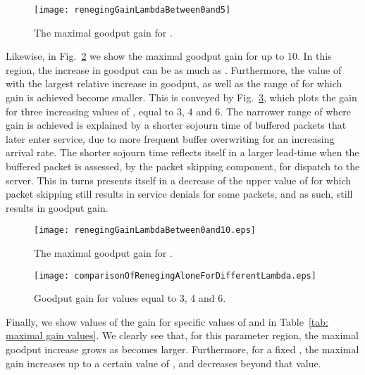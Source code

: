 \documentclass[preprint,12pt]{elsarticle}
\theoremstyle{definition}
\theoremstyle{plain}
\theoremstyle{remark}
\begin{document}
\begin{figure}[t]
\begin{center}
\texttt{[image: renegingGainLambdaBetween0and5]}
\caption{The maximal goodput gain for .}
\label{fig: maximal gain up to 5}
\end{center}
\end{figure}



Likewise, in Fig.~\ref{fig: maximal gain up to 10} we show the maximal goodput gain for  up to 10. In this region, the increase in goodput can be as much as . Furthermore, the value of  with the largest relative increase in goodput, as well as the range of  for which gain is achieved become smaller. This is conveyed by Fig.~\ref{fig: Goodput different rates}, which plots the gain for three increasing values of , equal to 3, 4 and 6.
The narrower range of  where gain is achieved is explained by a shorter sojourn time of buffered packets that later enter service, due to more frequent buffer overwriting for an increasing arrival rate. The shorter sojourn time reflects itself in a larger lead-time when the buffered packet is assessed, by the packet skipping component, for dispatch to the server. This in turns presents itself in a decrease of the upper value of  for which packet skipping still results in service denials for some packets, and as such, still results in goodput gain.

\begin{figure}[t]
\begin{center}
  \texttt{[image: renegingGainLambdaBetween0and10.eps]}
  \caption{The maximal goodput gain for .}
  \label{fig: maximal gain up to 10}
\end{center}
\end{figure}

\begin{figure}[t]
\begin{center}
  \texttt{[image: comparisonOfRenegingAloneForDifferentLambda.eps]}
  \caption{Goodput gain for  values equal to 3, 4 and 6.}
  \label{fig: Goodput different rates}
\end{center}
\end{figure}

Finally, we show values of the gain for specific values of  and  in Table~\ref{tab: maximal gain values}. We clearly see that, for this parameter region, the maximal goodput increase grows as  becomes larger. Furthermore, for a fixed , the maximal gain increases up to a certain value of , and decreases beyond that value.
\end{document}
